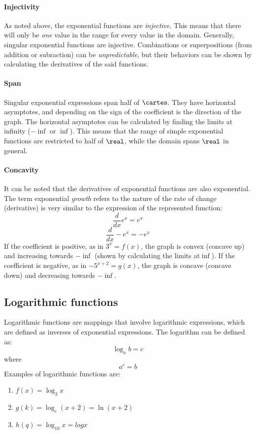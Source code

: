 \paragraph{Injectivity} As noted above, the exponential functions are \emph{injective}.
This means that there will only be \emph{one} value in the range for every value in the domain.
Generally, singular exponential functions are injective.
Combinations or superpositions (from addition or subraction) can be \emph{unpredictable}, but their behaviors can be shown by calculating the derivatives of the said functions.

\paragraph{Span} Singular exponential expressions span half of $\cartes$.
They have horizontal asymptotes, and depending on the sign of the coefficient is the direction of the graph.
The horizontal asymptotes can be calculated by finding the limits at infinity ($-\inf$ or $\inf$).
This means that the range of simple exponential functions are restricted to half of $\real$, while the domain spans $\real$ in general.

\paragraph{Concavity} It can be noted that the derivatives of exponential functions are also exponential.
The term exponential \emph{growth} refers to the nature of the rate of change (derivative) is very similar to the expression of the represented function:
$$\frac{d}{dx} e^x = e^x$$
$$\frac{d}{dx} -e^{x} = -e^x$$
If the coefficient is positive, as in $3^x = f(x)$, the graph is convex (concave up) and increasing towards $-\inf$ (shown by calculating the limits at$\inf$).
If the coefficient is negative, as in $-5^{x+2} = g(x)$, the graph is concave (concave down) and decreasing towards $-\inf$.

\subsection{Logarithmic functions}

Logarithmic functions are mappings that involve logarithmic expressions, which are defined as inverses of exponential expressions.
The logarithm can be defined as:
$$\log_a b = c$$
where
$$a^c = b$$
Examples of logarithmic functions are:
\begin{enumerate}
  \item $f(x) = \log_3 x$
  \item $g(k) = \log_e (x+2) = \ln (x+2)$
  \item $h(q) = \log_10 x = log x$
\end{enumerate}

